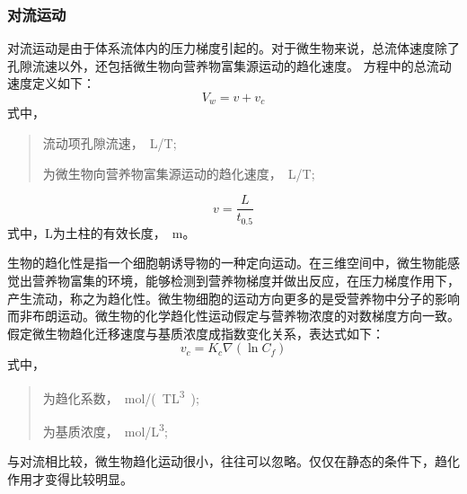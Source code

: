 \documentclass[a4paper,cs4size,adobefonts,fancyhdr]{ctexart}[2005/11/25]
\numberwithin{equation}{section} %
\begin{document}
\subsubsection{对流运动}
对流运动是由于体系流体内的压力梯度引起的。对于微生物来说，总流体速度除了孔隙流速以外，还包括微生物向营养物富集源运动的趋化速度。
方程中的总流动速度定义如下：
\begin{equation}
V_w=v+v_c
\end{equation}
式中，
\begin{quote}
	\begin{description}\setlength{\itemsep}{0em}
	\item[$V$]流动项孔隙流速，\SI{}{L/T};
	\item[$V_c$]为微生物向营养物富集源运动的趋化速度，\SI{}{L/T};
	\end{description}
	\end{quote}
\begin{equation}
v=\dfrac{L}{t_{0.5}}
\end{equation}                              
式中，L为土柱的有效长度，\SI{}{m}。\par
生物的趋化性是指一个细胞朝诱导物的一种定向运动。在三维空间中，微生物能感觉出营养物富集的环境，能够检测到营养物梯度并做出反应，在压力梯度作用下，产生流动，称之为趋化性。微生物细胞的运动方向更多的是受营养物中分子的影响而非布朗运动。微生物的化学趋化性运动假定与营养物浓度的对数梯度方向一致。假定微生物趋化迁移速度与基质浓度成指数变化关系，表达式如下：
\begin{equation}
v_c=K_c\nabla(\ln C_f)
\end{equation}
式中，
\begin{quote}
	\begin{description}\setlength{\itemsep}{0em}
	\item[$K_c$]为趋化系数，\SI{}{mol/(TL^3)};
	\item[$C_f$]为基质浓度，\SI{}{mol/L^3};
	\end{description}
	\end{quote}\par
与对流相比较，微生物趋化运动很小，往往可以忽略。仅仅在静态的条件下，趋化作用才变得比较明显。
\end{document}
